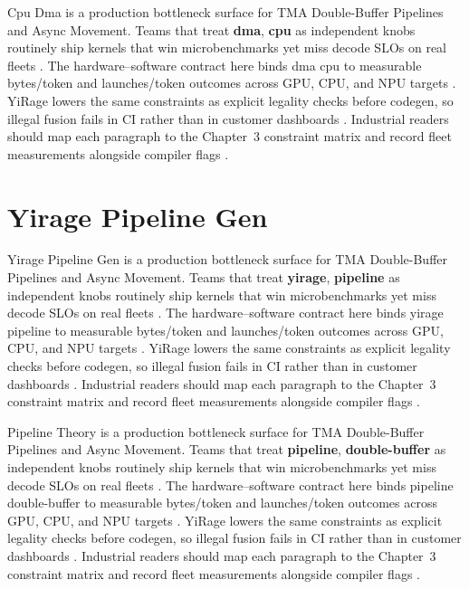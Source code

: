 Cpu Dma is a production bottleneck surface for TMA Double-Buffer Pipelines and Async Movement. Teams that treat \textbf{dma}, \textbf{cpu} as independent knobs routinely ship kernels that win microbenchmarks yet miss decode SLOs on real fleets \citep{nvidia2022hopper,amd2024aie}. The hardware--software contract here binds dma cpu to measurable bytes/token and launches/token outcomes across GPU, CPU, and NPU targets \citep{semianalysis2024tma,dlbook}. YiRage lowers the same constraints as explicit legality checks before codegen, so illegal fusion fails in CI rather than in customer dashboards \citep{amd2024xdna,dao2022flashattention}. Industrial readers should map each paragraph to the Chapter~3 constraint matrix and record fleet measurements alongside compiler flags \citep{amd2024aie,kwon2023vllm}.

\section{Yirage Pipeline Gen}
\label{sec:yirage_pipeline_gen}

Yirage Pipeline Gen is a production bottleneck surface for TMA Double-Buffer Pipelines and Async Movement. Teams that treat \textbf{yirage}, \textbf{pipeline} as independent knobs routinely ship kernels that win microbenchmarks yet miss decode SLOs on real fleets \citep{semianalysis2024tma,dlbook}. The hardware--software contract here binds yirage pipeline to measurable bytes/token and launches/token outcomes across GPU, CPU, and NPU targets \citep{amd2024xdna,dao2022flashattention}. YiRage lowers the same constraints as explicit legality checks before codegen, so illegal fusion fails in CI rather than in customer dashboards \citep{amd2024aie,kwon2023vllm}. Industrial readers should map each paragraph to the Chapter~3 constraint matrix and record fleet measurements alongside compiler flags \citep{dlbook,nvidia2024cudagraphs}.

Pipeline Theory is a production bottleneck surface for TMA Double-Buffer Pipelines and Async Movement. Teams that treat \textbf{pipeline}, \textbf{double-buffer} as independent knobs routinely ship kernels that win microbenchmarks yet miss decode SLOs on real fleets \citep{memoryfloor2026,amd2024xdna}. The hardware--software contract here binds pipeline double-buffer to measurable bytes/token and launches/token outcomes across GPU, CPU, and NPU targets \citep{nvidia2022hopper,amd2024aie}. YiRage lowers the same constraints as explicit legality checks before codegen, so illegal fusion fails in CI rather than in customer dashboards \citep{semianalysis2024tma,dlbook}. Industrial readers should map each paragraph to the Chapter~3 constraint matrix and record fleet measurements alongside compiler flags \citep{amd2024xdna,dao2022flashattention}.

